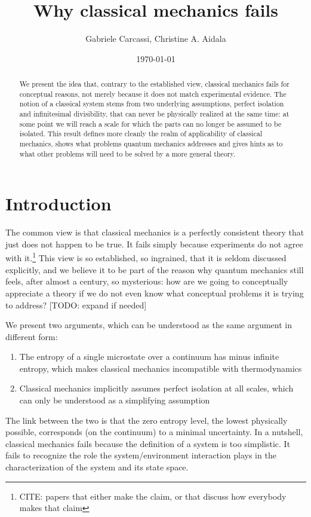 \documentclass[10pt,twocolumn, nofootinbib]{revtex4-2}
\begin{document}
\title{Why classical mechanics fails}
\author{Gabriele Carcassi, Christine A. Aidala}

\date{\today}


\begin{abstract}
We present the idea that, contrary to the established view, classical mechanics fails for conceptual reasons, not merely because it does not match experimental evidence. The notion of a classical system stems from two underlying assumptions, perfect isolation and infinitesimal divisibility, that can never be physically realized at the same time: at some point we will reach a scale for which the parts can no longer be assumed to be isolated. This result defines more cleanly the realm of applicability of classical mechanics, shows what problems quantum mechanics addresses and gives hints as to what other problems will need to be solved by a more general theory.
\end{abstract}

\maketitle

\section{Introduction}

The common view is that classical mechanics is a perfectly consistent theory that just does not happen to be true. It fails simply because experiments do not agree with it.\footnote{CITE: papers that either make the claim, or that discuss how everybody makes that claim} This view is so established, so ingrained, that it is seldom discussed explicitly, and we believe it to be part of the reason why quantum mechanics still feels, after almost a century, so mysterious: how are we going to conceptually appreciate a theory if we do not even know what conceptual problems it is trying to address? [TODO: expand if needed]

We present two arguments, which can be understood as the same argument in different form:
\begin{enumerate}
	\item The entropy of a single microstate over a continuum has minus infinite entropy, which makes classical mechanics incompatible with thermodynamics
	\item Classical mechanics implicitly assumes perfect isolation at all scales, which can only be understood as a simplifying assumption
\end{enumerate}
The link between the two is that the zero entropy level, the lowest physically possible, corresponds (on the continuum) to a minimal uncertainty. In a nutshell, classical mechanics fails because the definition of a system is too simplistic. It fails to recognize the role the system/environment interaction plays in the characterization of the system and its state space.
\end{document}
